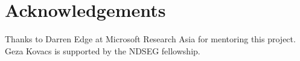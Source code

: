 \documentclass{chi-ext}
\begin{document}




\section{Acknowledgements}

Thanks to Darren Edge at Microsoft Research Asia for mentoring this project. Geza Kovacs is supported by the NDSEG fellowship.



\end{document}
